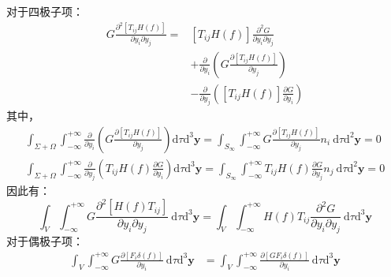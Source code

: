 \begin{enumerate}
\begin{equation}
        \end{equation}
        对于四极子项：
        \begin{equation}
            \begin{aligned}
                G \frac{\partial^{2}\left[T_{i j} H(f)\right]}{\partial y_{i} \partial y_{j}}
                =&\left[T_{i j} H(f)\right] \frac{\partial^{2} G}{\partial y_{i} \partial y_{j}} \\
                &+\frac{\partial}{\partial y_{i}}\left(G \frac{\partial\left[T_{i j} H(f)\right]}{\partial y_{j}}\right) \\
                &-\frac{\partial}{\partial y_{j}}\left(\left[T_{i j} H(f)\right] \frac{\partial G}{\partial y_{i}}\right)
            \end{aligned}
        \end{equation}
        其中，
        \begin{align*}
            \int_{\Sigma+\Omega} \int_{-\infty}^{+\infty} \frac{\partial}{\partial y_{i}}\left(G \frac{\partial\left[T_{i j} H(f)\right]}{\partial y_{j}}\right) \mathrm{d} \tau \mathrm{d}^{3} \mathbf{y}=\int_{S_{\infty}} \int_{-\infty}^{+\infty} G \frac{\partial\left[T_{i j} H(f)\right]}{\partial y_{j}} n_{i} \mathrm{~d} \tau \mathrm{d}^{2} \mathbf{y}=0 \\
            \int_{\Sigma+\Omega} \int_{-\infty}^{+\infty} \frac{\partial}{\partial y_{j}}\left(T_{i j} H(f) \frac{\partial G}{\partial y_{i}}\right) \mathrm{d} \tau \mathrm{d}^{3} \mathbf{y}=\int_{S_{\infty}} \int_{-\infty}^{+\infty} T_{i j} H(f) \frac{\partial G}{\partial y_{j}} n_{j} \mathrm{~d} \tau \mathrm{d}^{2} \mathbf{y}=0
        \end{align*}
        因此有：
        \begin{equation}
            \int_{V} \int_{-\infty}^{+\infty} G \frac{\partial^{2}\left[H(f) T_{i j}\right]}{\partial y_{i} \partial y_{j}} \mathrm{~d} \tau \mathrm{d}^{3} \mathbf{y}=\int_{V} \int_{-\infty}^{+\infty} H(f) T_{i j} \frac{\partial^{2} G}{\partial y_{i} \partial y_{j}} \mathrm{~d} \tau \mathrm{d}^{3} \mathbf{y}
        \end{equation}
        对于偶极子项：
        \begin{equation}
            \begin{aligned}
                \int_{V} \int_{-\infty}^{+\infty} G \frac{\partial\left[F_{i} \delta(f)\right]}{\partial y_{i}} \mathrm{~d} \tau \mathrm{d}^{3} \mathbf{y} 
                &=\int_{V} \int_{-\infty}^{+\infty} \frac{\partial\left[G F_{i} \delta(f)\right]}{\partial y_{i}} \mathrm{~d} \tau \mathrm{d}^{3} \mathbf{y} \\

\end{aligned}
\end{equation}
\end{enumerate}
